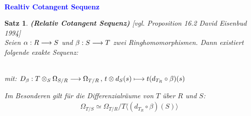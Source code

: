 \documentclass[10pt,a4paper]{report}
\newcommand{\ModulsOfDifferenzials}{David Eisenbud 1994}
\newcounter{Aussage}[chapter]
\newtheorem{satz}[Aussage]{Satz}
\newcommand{\functionfront}[3]{\nolinebreak{#1:#2 \longrightarrow #3}}
\newcommand{\function}[5]{\nolinebreak{#1:#2 \longrightarrow #3 \, , \, #4 \longmapsto #5}}
\newcommand{\divR}[2]{\Omega_{#1/#2}}
\newcommand{\divf}[1]{d_{#1}}
\newcommand{\Tensor}[3]{#1 \otimes_{#2} #3}
\newcommand{\tensor}[3]{#1 \otimes #3}
\begin{document}
\ \\
\textcolor{blue}{\textbf{Realtiv Cotangent Sequenz}}
\begin{satz}\label{Cotangent Sequenz} \textbf{(Relativ Cotangent Sequenz)} \textit{[vgl. Proposition 16.2 \ModulsOfDifferenzials]}\\
Seien $\functionfront{\alpha}{R}{S}$ und $\functionfront{\beta}{S}{T}$ zwei Ringhomomorphismen. Dann existiert folgende exakte Sequenz:
\begin{center}
\ \\
mit: $\function{D_{\beta}}{\Tensor{T}{S}{\divR{S}{R}}}{\divR{T}{R}}{\tensor{t}{S}{\divf{S}(s)}}{t(\divf{T_R} \circ \beta)(s)}$
\end{center}
Im Besonderen gilt für die Differenzialräume von $T$ über $R$ und $S$:
\begin{gather*}
\divR{T}{S} \simeq \divR{T}{R}/T \langle (\divf{T_R} \circ \beta)(S) \rangle
\end{gather*}
\end{satz}
\end{document}
